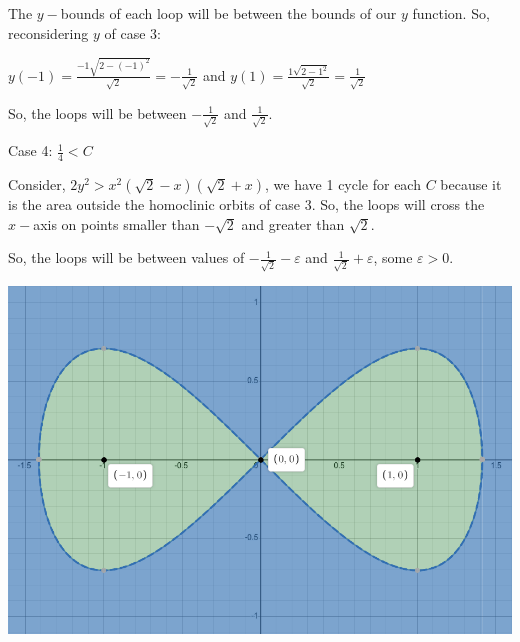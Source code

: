 \documentclass{article}
\begin{document}
The $y-$bounds of each loop will be between the bounds
of our $y$ function. So, reconsidering $y$ of case 3:

$y(-1) =
\frac{-1\sqrt{2 -(-1)^2}}{\sqrt{2}} = -\frac{1}{\sqrt{2}} $
 and
$y(1) =  \frac{1\sqrt{2 -1^2}}{\sqrt{2}} = \frac{1}{\sqrt{2}} $

So, the loops will be between $-\frac{1}{\sqrt{2}}$ and
$\frac{1}{\sqrt{2}}$.

Case 4: $\frac{1}{4} < C$

Consider, $2y^2 > x^2 (\sqrt{2} -x)(\sqrt{2} + x)$, we have 1
cycle for each $C$ because it is the area outside the homoclinic
orbits of case 3. So, the loops will cross the $x-$axis on points
smaller than $-\sqrt{2}$ and greater than $\sqrt{2}$.

So, the loops will be between values of $-\frac{1}{\sqrt{2}} -\varepsilon$ and
$\frac{1}{\sqrt{2}} + \varepsilon$, some $\varepsilon>0$.

\includegraphics[width=\textwidth]{2}
\end{document}
